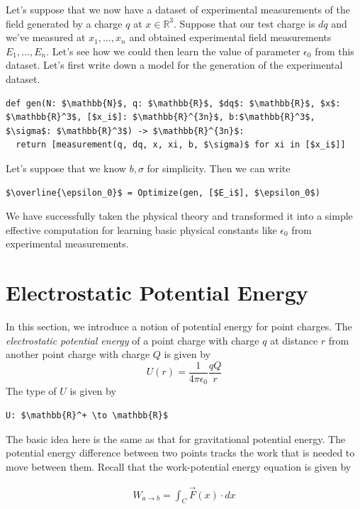 \documentclass[book.tex]{subfiles}
\begin{document}
Let's suppose that we now have a dataset of experimental measurements of the field generated by a charge $q$ at $x \in \mathbb{R}^3$. Suppose that our test charge is $dq$ and we've measured at $x_1, \dotsc, x_n$ and obtained experimental field measurements $E_1, \dotsc, E_n$. Let's see how we could then learn the value of parameter $\epsilon_0$ from this dataset. Let's first write down a model for the generation of the experimental dataset.

\begin{lstlisting}
def gen(N: $\mathbb{N}$, q: $\mathbb{R}$, $dq$: $\mathbb{R}$, $x$: $\mathbb{R}^3$, [$x_i$]: $\mathbb{R}^{3n}$, b:$\mathbb{R}^3$, $\sigma$: $\mathbb{R}^3$) -> $\mathbb{R}^{3n}$:
  return [measurement(q, dq, x, xi, b, $\sigma)$ for xi in [$x_i$]]
\end{lstlisting}

Let's suppose that we know $b, \sigma$ for simplicity. Then we can write

\begin{lstlisting}
$\overline{\epsilon_0}$ = Optimize(gen, [$E_i$], $\epsilon_0$)
\end{lstlisting}

We have successfully taken the physical theory and transformed it into a simple effective computation for learning basic physical constants like $\epsilon_0$ from experimental measurements.

\section{Electrostatic Potential Energy}

In this section, we introduce a notion of potential energy for point charges. The \textit{electrostatic potential energy} of a point charge with charge $q$ at distance $r$ from another point charge with charge $Q$ is given by
\begin{equation}
    U(r) = \frac{1}{4\pi \epsilon_0} \frac{qQ}{r}
\end{equation}
The type of $U$ is given by
\begin{lstlisting}
U: $\mathbb{R}^+ \to \mathbb{R}$
\end{lstlisting}
The basic idea here is the same as that for gravitational potential energy. The potential energy difference between two points tracks the work that is needed to move between them. Recall that the work-potential energy equation is given by

\begin{align}
    W_{a\to b} = \int_{C} \vec{F}(x) \cdot dx
\end{align}
\end{document}
